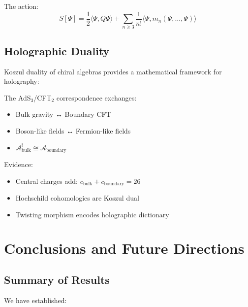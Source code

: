 The action:
\[
S[\Psi] = \frac{1}{2}\langle \Psi, Q\Psi \rangle + \sum_{n \geq 3} \frac{1}{n!}\langle \Psi, m_n(\Psi,\ldots,\Psi)\rangle
\]

\subsection{Holographic Duality}

Koszul duality of chiral algebras provides a mathematical framework for holography:

\begin{conjecture}
The AdS$_3$/CFT$_2$ correspondence exchanges:
\begin{itemize}
\item Bulk gravity ↔ Boundary CFT
\item Boson-like fields ↔ Fermion-like fields  
\item $\mathcal{A}_{\text{bulk}}^! \cong \mathcal{A}_{\text{boundary}}$
\end{itemize}
\end{conjecture}

Evidence:
\begin{itemize}
\item Central charges add: $c_{\text{bulk}} + c_{\text{boundary}} = 26$
\item Hochschild cohomologies are Koszul dual
\item Twisting morphism encodes holographic dictionary
\end{itemize}

\section{Conclusions and Future Directions}

\subsection{Summary of Results}

We have established:

